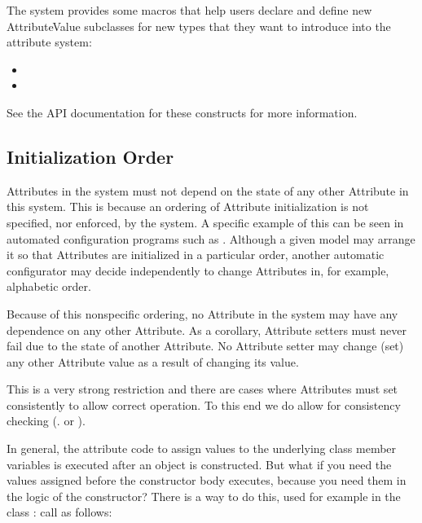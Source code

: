 \documentclass[letterpaper,10pt,english]{sphinxmanual}
\renewcommand{\sphinxcode}[1]{\texttt{\small{#1}}}
\begin{document}
The system provides some macros that help users declare and define
new AttributeValue subclasses for new types that they want to introduce into
the attribute system:
\begin{itemize}
\item {} 
\sphinxcode{}

\item {} 
\sphinxcode{}

\end{itemize}

See the API documentation for these constructs for more information.


\subsection{Initialization Order}
\label{\detokenize{attributes:initialization-order}}
Attributes in the system must not depend on the state of any other Attribute in
this system. This is because an ordering of Attribute initialization is not
specified, nor enforced, by the system. A specific example of this can be seen
in automated configuration programs such as \sphinxcode{}.
Although a given model may arrange it so that Attributes are initialized in a
particular order, another automatic configurator may decide independently to
change Attributes in, for example, alphabetic order.

Because of this non\sphinxhyphen{}specific ordering, no Attribute in the system may have any
dependence on any other Attribute. As a corollary, Attribute setters must never
fail due to the state of another Attribute. No Attribute setter may change (set)
any other Attribute value as a result of changing its value.

This is a very strong restriction and there are cases where Attributes must set
consistently to allow correct operation. To this end we do allow for consistency
checking  (. \sphinxcode{}
or \sphinxcode{}).

In general, the attribute code to assign values to the underlying class member
variables is executed after an object is constructed. But what if you need the
values assigned before the constructor body executes, because you need them in
the logic of the constructor? There is a way to do this, used for example in the
class \sphinxcode{}: call \sphinxcode{} as
follows:
\end{document}
